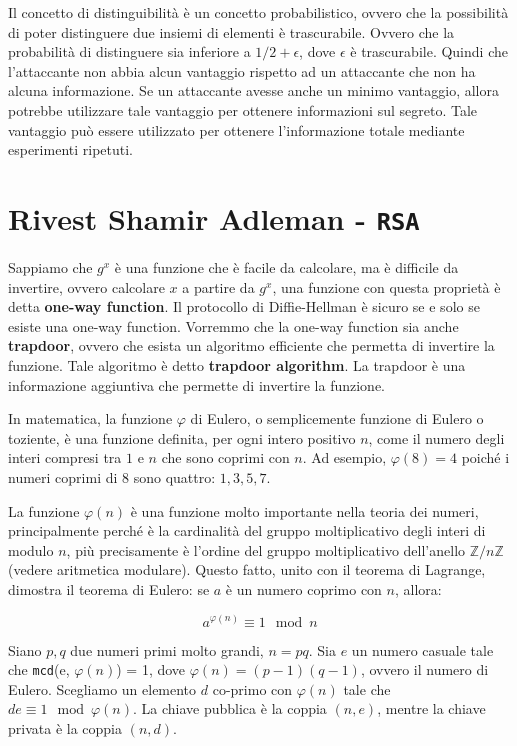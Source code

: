 Il concetto di distinguibilità è un concetto probabilistico, ovvero che la possibilità di poter 
distinguere due insiemi di elementi è trascurabile. Ovvero che la probabilità di distinguere 
sia inferiore a $1/2 + \epsilon$, dove $\epsilon$ è trascurabile. Quindi che l'attaccante non abbia 
alcun vantaggio rispetto ad un attaccante che non ha alcuna informazione.
Se un attaccante avesse anche un minimo vantaggio, allora potrebbe utilizzare tale vantaggio per
ottenere informazioni sul segreto. Tale vantaggio può essere utilizzato per ottenere l'informazione 
totale mediante esperimenti ripetuti.

\section{Rivest Shamir Adleman - \texttt{RSA}}
Sappiamo che $g^x$ è una funzione che è facile da calcolare, ma è difficile da invertire, ovvero calcolare $x$
a partire da $g^x$, una funzione con questa proprietà è detta \textbf{one-way function}. Il protocollo di 
Diffie-Hellman è sicuro se e solo se esiste una one-way function.
Vorremmo che la one-way function sia anche \textbf{trapdoor}, ovvero che esista un algoritmo 
efficiente che permetta di invertire la funzione. Tale algoritmo è detto \textbf{trapdoor algorithm}.
La trapdoor è una informazione aggiuntiva che permette di invertire la funzione.

\begin{tcolorbox}[title = Funzione di Eulero $\varphi$]
  In matematica, la funzione \(\varphi\) di Eulero, o semplicemente funzione di Eulero
  o toziente, è una funzione definita, per ogni intero positivo \(n\), come il numero
  degli interi compresi tra $1$ e \(n\) che sono coprimi con \(n\). Ad esempio,
  \(\varphi(8) = 4\) poiché i numeri coprimi di $8$ sono quattro: $1, 3, 5, 7$.
  
  La funzione \(\varphi(n)\) è una funzione molto importante nella teoria dei numeri,
  principalmente perché è la cardinalità del gruppo moltiplicativo degli interi di
  modulo \(n\), più precisamente è l'ordine del gruppo moltiplicativo dell'anello
  \(\mathbb{Z}/n\mathbb{Z}\) (vedere aritmetica modulare). Questo fatto, unito con
  il teorema di Lagrange, dimostra il teorema di Eulero: se \(a\) è un numero coprimo
  con \(n\), allora:

  \[ a^{\varphi(n)} \equiv 1 \mod n \]

\end{tcolorbox}
Siano $p, q$ due numeri primi molto grandi, $n = pq$. Sia $e$ un numero casuale tale che 
\texttt{mcd}(e, $\varphi(n)$) = 1, dove $\varphi(n) = (p-1)(q-1)$, ovvero il numero di Eulero. Scegliamo 
un elemento $d$ co-primo con $\varphi(n)$ tale che $de \equiv 1 \mod \varphi(n)$.
La chiave pubblica è la coppia $(n, e)$, mentre la chiave privata è la coppia $(n, d)$.
